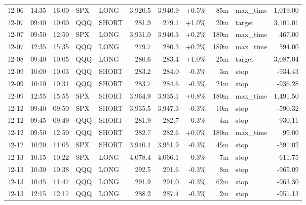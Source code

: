 \documentclass[11pt,a4paper,twoside]{article}
\begin{document}
\begin{center}
\begin{longtable}{>{\color{txtmain}}l l l l l r r r r >{\color{txtmain}}l r}
12-06 & 14:35 & 16:00 & SPX & LONG & 3,920.5 & 3,940.9 & \textcolor{wingreen}{+0.5\%} & 85m & max\_time & \textcolor{wingreen}{1,019.00} \\
12-07 & 09:40 & 10:00 & QQQ & SHORT & 281.9 & 279.1 & \textcolor{wingreen}{+1.0\%} & 20m & target & \textcolor{wingreen}{3,101.01} \\
12-07 & 09:50 & 12:50 & SPX & LONG & 3,931.0 & 3,940.3 & \textcolor{wingreen}{+0.2\%} & 180m & max\_time & \textcolor{wingreen}{467.00} \\
12-07 & 12:35 & 15:35 & QQQ & LONG & 279.7 & 280.3 & \textcolor{wingreen}{+0.2\%} & 180m & max\_time & \textcolor{wingreen}{594.00} \\
12-08 & 09:40 & 10:05 & QQQ & LONG & 280.6 & 283.4 & \textcolor{wingreen}{+1.0\%} & 25m & target & \textcolor{wingreen}{3,087.04} \\
12-09 & 10:00 & 10:03 & QQQ & SHORT & 283.2 & 284.0 & \textcolor{lossred}{-0.3\%} & 3m & stop & \textcolor{lossred}{-934.43} \\
12-09 & 10:10 & 10:31 & QQQ & SHORT & 283.7 & 284.6 & \textcolor{lossred}{-0.3\%} & 21m & stop & \textcolor{lossred}{-936.28} \\
12-09 & 12:55 & 15:55 & SPX & SHORT & 3,964.9 & 3,935.1 & \textcolor{wingreen}{+0.8\%} & 180m & max\_time & \textcolor{wingreen}{1,491.50} \\
12-12 & 09:40 & 09:50 & SPX & SHORT & 3,935.5 & 3,947.3 & \textcolor{lossred}{-0.3\%} & 10m & stop & \textcolor{lossred}{-590.32} \\
12-12 & 09:45 & 09:49 & QQQ & SHORT & 281.9 & 282.7 & \textcolor{lossred}{-0.3\%} & 4m & stop & \textcolor{lossred}{-930.11} \\
12-12 & 09:50 & 12:50 & QQQ & SHORT & 282.7 & 282.6 & \textcolor{wingreen}{+0.0\%} & 180m & max\_time & \textcolor{wingreen}{99.00} \\
12-12 & 10:20 & 11:05 & SPX & SHORT & 3,940.1 & 3,951.9 & \textcolor{lossred}{-0.3\%} & 45m & stop & \textcolor{lossred}{-591.02} \\
12-13 & 10:15 & 10:22 & SPX & LONG & 4,078.4 & 4,066.1 & \textcolor{lossred}{-0.3\%} & 7m & stop & \textcolor{lossred}{-611.75} \\
12-13 & 10:30 & 10:38 & QQQ & LONG & 292.5 & 291.6 & \textcolor{lossred}{-0.3\%} & 8m & stop & \textcolor{lossred}{-965.09} \\
12-13 & 10:45 & 11:47 & QQQ & LONG & 291.9 & 291.0 & \textcolor{lossred}{-0.3\%} & 62m & stop & \textcolor{lossred}{-963.30} \\
12-13 & 12:15 & 12:17 & QQQ & LONG & 288.2 & 287.4 & \textcolor{lossred}{-0.3\%} & 2m & stop & \textcolor{lossred}{-951.13} \\

\end{longtable}
\end{center}
\end{document}
